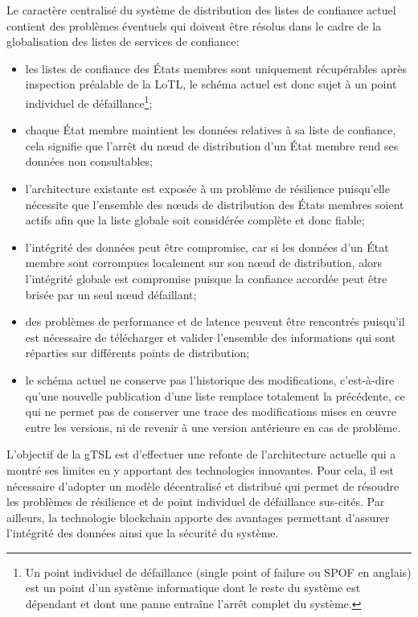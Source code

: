\documentclass{tnreport}
\begin{document}
Le caractère centralisé du système de distribution des listes de confiance actuel contient des 
problèmes éventuels qui doivent être résolus dans le cadre de la globalisation des listes de services de confiance:
\begin{itemize}
	\item les listes de confiance des États membres sont uniquement récupérables après inspection préalable de la LoTL, le schéma actuel est donc sujet à un point individuel de défaillance\footnote{Un point individuel de défaillance (single point of failure ou SPOF en anglais) est un point d'un système informatique dont le reste du système est dépendant et dont une panne entraîne l'arrêt complet du système.};
	\item chaque État membre maintient les données relatives à sa liste de confiance, cela signifie que l'arrêt du nœud de distribution d'un État membre rend ses données non consultables;
	\item l'architecture existante est exposée à un problème de résilience puisqu'elle nécessite que l'ensemble des nœuds de distribution des États membres soient actifs afin que la liste globale soit considérée complète et donc fiable;
	\item l'intégrité des données peut être compromise, car si les données d'un État membre sont corrompues localement sur son nœud de distribution, alors l'intégrité globale est compromise puisque la confiance accordée peut être brisée par un seul nœud défaillant;
	\item des problèmes de performance et de latence peuvent être rencontrés puisqu'il est nécessaire de télécharger et valider l'ensemble des informations qui sont réparties sur différents points de distribution;
	\item le schéma actuel ne conserve pas l'historique des modifications, c'est-à-dire qu'une nouvelle publication d'une liste remplace totalement la précédente, ce qui ne permet pas de conserver une trace des modifications mises en œuvre entre les versions, ni de revenir à une version antérieure en cas de problème.
	\newline
\end{itemize}

L'objectif de la gTSL est d'effectuer une refonte de l'architecture actuelle qui a montré ses limites en y apportant des technologies innovantes. Pour cela, il est nécessaire d'adopter un modèle décentralisé et distribué qui permet de résoudre les problèmes de résilience et de point individuel de défaillance sus-cités. Par ailleurs, la technologie blockchain apporte des avantages permettant d'assurer l'intégrité des données ainsi que la sécurité du système.
\end{document}
